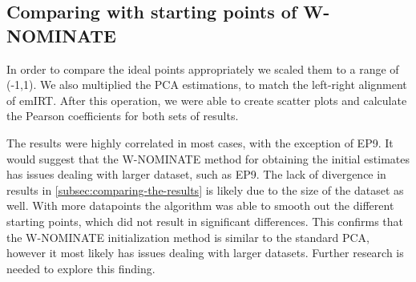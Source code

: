 \documentclass[a4paper,12pt]{report}
\begin{document}
            \subsection{Comparing with starting points of W-NOMINATE}
                \label{subsec:comparing-with-starting-points-of-w-nominate}
                In order to compare the ideal points appropriately we scaled them to a range of (-1,1). We also
                multiplied the
                PCA estimations, to match the left-right alignment of emIRT. After this operation, we were able to
                create scatter
                plots and calculate the Pearson coefficients for both sets
                of results.

                The results were highly correlated in most cases, with the exception of EP9. It would suggest that
                the W-NOMINATE method for obtaining the initial estimates has issues dealing with larger dataset, such
                as EP9.
                The lack of divergence in results in
                \ref{subsec:comparing-the-results}
                is likely due to the size of the dataset as well. With more datapoints the
                algorithm was able to smooth out the different starting points, which did not result in
                significant differences.
                This confirms that the W-NOMINATE initialization method is similar to the standard PCA, however
                it most likely
                has issues dealing with larger datasets. Further research is needed to explore this finding.
\end{document}
